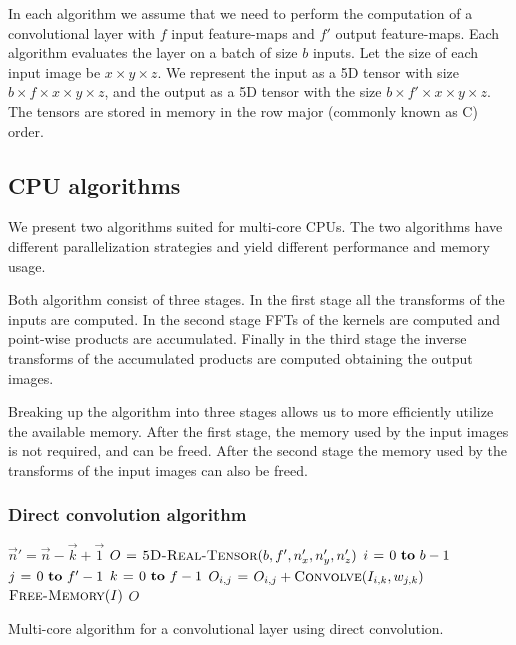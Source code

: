 \documentclass[conference]{IEEEtran}
\begin{document}
In each algorithm we assume that we need to perform the computation of
a convolutional layer with $f$ input feature-maps and $f'$ output
feature-maps.  Each algorithm evaluates the layer on a batch of size
$b$ inputs.  Let the size of each input image be $x \times y \times
z$.  We represent the input as a 5D tensor with size $b \times
f \times x \times y \times z$, and the output as a 5D tensor with the
size $b \times f' \times x \times y \times z$.  The tensors are stored
in memory in the row major (commonly known as C) order.

\subsection{CPU algorithms}

We present two algorithms suited for multi-core CPUs.  The two
algorithms have different parallelization strategies and yield
different performance and memory usage.

Both algorithm consist of three stages.  In the first stage all the
transforms of the inputs are computed.  In the second stage FFTs of
the kernels are computed and point-wise products are accumulated.
Finally in the third stage the inverse transforms of the accumulated
products are computed obtaining the output images.

Breaking up the algorithm into three stages allows us to more
efficiently utilize the available memory.  After the first stage, the
memory used by the input images is not required, and can be freed.
After the second stage the memory used by the transforms of the input
images can also be freed.

\subsubsection{Direct convolution algorithm}

\begin{algorithm}
  {\small
  \begin{codebox}
    \li $\vec{n}' = \vec{n} - \vec{k} + \vec{1}$
    \li $O \mathrel{\hspace{1pt}=\hspace{1pt}} \textnormal{\scshape5D-Real-Tensor}(b,f',n'_x,n'_y,n'_z)$
    \li {} $i \gets 0 \To b-1$
    \li   \Do {} $j \gets 0 \To f'-1$
    \li     \Do \For $k \gets 0 \To f-1$
    \li     \Do $O_{i,j} \mathrel{\hspace{1pt}=\hspace{1pt}} O_{i,j} + \textnormal{\scshape Convolve}(I_{i,k},w_{j,k})$
    \End \End \End
    \li $\textnormal{\scshape Free-Memory}(I)$
    \li \Return $O$
  \end{codebox}
  }

  \caption{Multi-core algorithm for a convolutional layer using direct
  convolution.}
  \label{alg:cpu_direct}
\end{algorithm}
\end{document}
